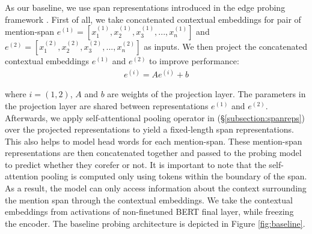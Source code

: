 \documentclass[11pt]{article}
\begin{document}



As our baseline, we use span representations introduced in the edge probing framework \parencite{tenney2019context}. First of all, we take concatenated contextual embeddings for pair of mention-span $e^{(1)} = [x_{1}^{(1)}, x_{2}^{(1)}, x_{3}^{(1)}, ..., x_{n}^{(1)}]$ and $e^{(2)} = [x_{1}^{(2)}, x_{2}^{(2)}, x_{3}^{(2)}, ..., x_{n}^{(2)}]$ as inputs. We then project the concatenated contextual embeddings $e^{(1)}$ and $e^{(2)}$ to improve performance:
\begin{align*}
e^{(i)} = Ae^{(i)} + b
\end{align*}

where $i = (1,2)$, $A$ and $b$ are weights of the projection layer. The parameters in the projection layer are shared between representations $e^{(1)}$ and $e^{(2)}$. Afterwards, we apply self-attentional pooling operator in (\S \ref{subsection:spanreps}) over the projected representations to yield a fixed-length span representations. This also helps to model head words for each mention-span. These mention-span representations are then concatenated together and passed to the probing model to predict whether they corefer or not. It is important to note that the self-attention pooling is computed only using tokens within the boundary of the span. As a result, the model can only access information about the context surrounding the mention span through the contextual embeddings. We take the contextual embeddings from activations of non-finetuned BERT final layer, while freezing the encoder. The baseline probing architecture is depicted in Figure \ref{fig:baseline}. 
\end{document}
